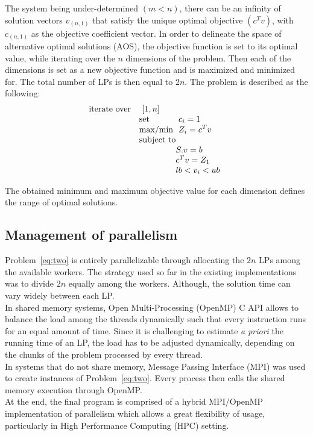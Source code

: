 \documentclass[letterpaper, 10 pt, conference]{ieeeconf}  %
\begin{document}
The system being under-determined $(m<n)$, there can be an infinity of solution vectors $v_{(n,1)}$ that satisfy the unique optimal objective $(c^{T}v)$, with $c_{(n,1)}$ as the objective coefficient vector. In order to delineate the space of alternative optimal solutions (AOS), the objective function is set to its optimal value, while iterating over the $n$ dimensions of the problem. Then each of the dimensions is set as a new objective function and is maximized and minimized for. The total number of LPs is then equal to $2n$. The problem is described as the following:
\begin{equation} \label{eq:two}
\begin{array}{ll@{}ll@{}ll}
\text{iterate over} & \displaystyle\ [1,n] &\\
& \text{set} & \displaystyle\ c_{i}=1 &\\
& \text{max/min}  & \displaystyle\ Z_{i}=c^{T}v &\\
& \text{subject to}\\
& & S.v=b \\
& & c^{T}v=Z_{1} \\
& & lb<v_{i}<ub
\end{array}
\end{equation}

The obtained minimum and maximum objective value for each dimension defines the range of optimal solutions.
\subsection{Management of parallelism}
Problem~\ref{eq:two} is entirely parallelizable through allocating the $2n$ LPs among the available workers. The strategy used so far in the existing implementations was to divide $2n$ equally among the workers. Although, the solution time can vary widely between each LP. \\
In shared memory systems, Open Multi-Processing (OpenMP) C API allows to balance the load among the threads dynamically such that every instruction runs for an equal amount of time. Since it is challenging to estimate \textit{a priori} the running time of an LP, the load has to be adjusted dynamically, depending on the chunks of the problem processed by every thread.\\
In systems that do not share memory, Message Passing Interface (MPI) was used to create instances of Problem~\ref{eq:two}. Every process then calls the shared memory execution through OpenMP.\\
At the end, the final program is comprised of a hybrid MPI/OpenMP implementation of parallelism which allows a great flexibility of usage, particularly in High Performance Computing (HPC) setting.
\end{document}
